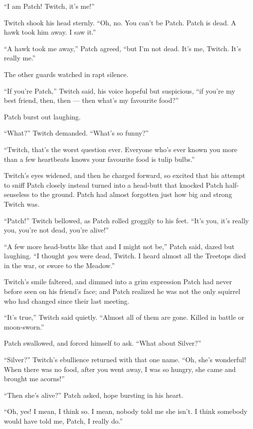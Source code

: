 \documentclass[12pt]{memoir}
\begin{document}
“I am Patch! Twitch, it’s me!”

Twitch shook his head sternly. “Oh, no. You can’t be Patch. Patch is
dead. A hawk took him away. I saw it.”

“A hawk took me away,” Patch agreed, “but I’m not dead. It’s me,
Twitch. It’s really me.”

The other guards watched in rapt silence.

“If you’re Patch,” Twitch said, his voice hopeful but suspicious, “if
you’re my best friend, then, then — then what’s my favourite food?”

Patch burst out laughing.

“What?” Twitch demanded. “What’s so funny?”

“Twitch, that’s the worst question ever. Everyone who’s ever known you
more than a few heartbeats knows your favourite food is tulip bulbs.”

Twitch’s eyes widened, and then he charged forward, so excited that
his attempt to sniff Patch closely instead turned into a head-butt
that knocked Patch half-senseless to the ground. Patch had almost
forgotten just how big and strong Twitch was.

“Patch!” Twitch bellowed, as Patch rolled groggily to his feet. “It’s
you, it’s really you, you’re not dead, you’re alive!”

“A few more head-butts like that and I might not be,” Patch said,
dazed but laughing. “I thought \textit{you} were dead, Twitch. I heard
almost all the Treetops died in the war, or swore to the Meadow.”

Twitch’s smile faltered, and dimmed into a grim expression Patch had
never before seen on his friend’s face; and Patch realized he was not
the only squirrel who had changed since their last meeting.

“It’s true,” Twitch said quietly. “Almost all of them are gone. Killed
in battle or moon-sworn.”

Patch swallowed, and forced himself to ask. “What about Silver?”

“Silver?” Twitch’s ebullience returned with that one name. “Oh, she’s
wonderful! When there was no food, after you went away, I was so
hungry, she came and brought me acorns!”

“Then she’s alive?” Patch asked, hope bursting in his heart.

“Oh, yes! I mean, I think so. I mean, nobody told me she isn’t. I
think somebody would have told me, Patch, I really do.”
\end{document}
